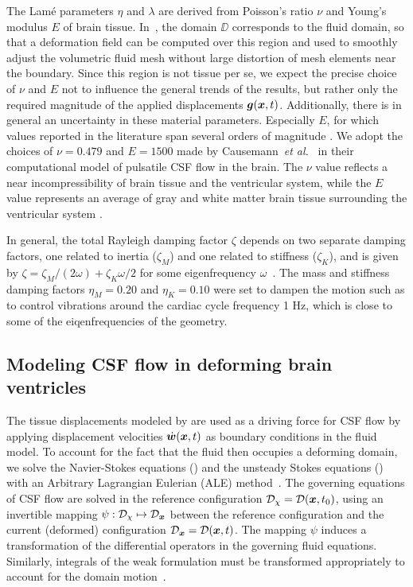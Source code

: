\documentclass{template}
\begin{document}
The Lamé parameters $\eta$ and $\lambda$ are derived from
Poisson's ratio $\nu$ and Young's modulus $E$ of brain tissue.
In~, the domain $\DD$
corresponds to the fluid domain, so that a deformation field
can be computed over this region and used to smoothly
adjust the volumetric fluid mesh without large distortion
of mesh elements near the boundary. 
Since this region is not tissue per se,
we expect the precise choice of $\nu$ and $E$ not to
influence the general trends of the results, but rather
only the required magnitude of the applied displacements $\bm{g}(\bm{x}, t)$.
Additionally, there is in general an uncertainty
in these material parameters. Especially $E$, 
for which values reported in the literature span several orders of magnitude
\citep{Budday2015Mechanical, Cheng2010ComputationalModel,
Cheng2007UnconfinedCompression, Sweetman2011ThreeDimensional}.
We adopt the choices of $\nu=0.479$ and $E=1500$
made by Causemann~\emph{et al.}~\citep{Causemann2022HumanFramework}
in their computational model of pulsatile CSF flow in the brain. The $\nu$ value 
reflects a near incompressibility of brain tissue and the ventricular system,
while the $E$ value represents an average of
gray and white matter brain tissue surrounding the ventricular system
\citep{Budday2015Mechanical}. 

In general, the total Rayleigh damping factor $\zeta$ depends on
two separate damping factors, one related to inertia ($\zeta_M$)
and one related to stiffness ($\zeta_K$), and is given by
$\zeta = \zeta_M / (2\omega) + \zeta_K\omega / 2$
for some eigenfrequency $\omega$~\citep{ChopraAnilK2007Dynamics}.
The mass and stiffness damping factors
$\eta_M = 0.20$ and $\eta_K = 0.10$ were set to dampen the motion
such as to control vibrations around the cardiac cycle frequency 1 Hz,
which is close to some of the eiqenfrequencies of the geometry.

\subsection{Modeling CSF flow in deforming brain ventricles}
The tissue displacements modeled by 
are used as a driving force for CSF flow by applying displacement velocities
$\dot{\bm{w}}(\bm{x}, t)$ as boundary conditions in the fluid model.
To account for the fact that the fluid then occupies a deforming domain,
we solve the Navier-Stokes equations ()
and the unsteady Stokes equations ()
with an Arbitrary Lagrangian Eulerian (ALE)
method~\citep{Duarte2004ALE,Scovazzi2007LectureNotes}.
The governing equations of CSF flow are solved in the reference configuration
$\mathcal{D}_{\chi} = \mathcal{D}(\bm{x}, t_0)$, using an invertible mapping
$\psi : \mathcal{D}_{\chi}\mapsto\mathcal{D}_{\bm{x}}$ between the reference configuration
and the current (deformed) configuration $\mathcal{D}_{\bm{x}} = \mathcal{D}(\bm{x}, t)$. 
The mapping $\psi$ induces a transformation of the differential operators
in the governing fluid equations. Similarly, integrals of the weak formulation
must be transformed appropriately to account for the
domain motion~\citep{Scovazzi2007LectureNotes}.
\end{document}
